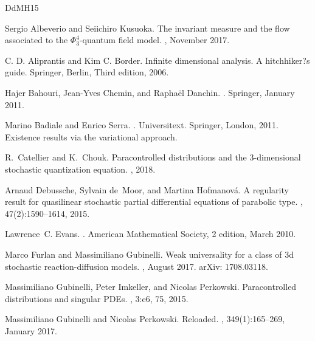 \documentclass[a4paper,11pt]{article}
\numberwithin{equation}{section}
\newcommand{\8}{\infty}
\begin{document}
\begin{thebibliography}{DdMH15}

Sergio Albeverio and Seiichiro Kusuoka.
\newblock The invariant measure and the flow associated to the
  {$\Phi^4_3$}-quantum field model.
, November 2017.


C. D. Aliprantis and Kim C. Border.
\newblock Infinite dimensional analysis. A hitchhiker?s guide.
\newblock Springer, Berlin, Third edition, 2006. 

Hajer Bahouri, Jean-Yves Chemin, and Rapha{\"e}l Danchin.
.
\newblock Springer, January 2011.

Marino Badiale and Enrico Serra.
.
\newblock Universitext. Springer, London, 2011.
\newblock Existence results via the variational approach.

R.~Catellier and K.~Chouk.
\newblock Paracontrolled distributions and the 3-dimensional stochastic
  quantization equation.
, 2018.

Arnaud Debussche, Sylvain de~Moor, and Martina Hofmanov\'a.
\newblock A regularity result for quasilinear stochastic partial differential
  equations of parabolic type.
, 47(2):1590--1614, 2015.

Lawrence~C. Evans.
.
\newblock American Mathematical Society, 2 edition, March 2010.

Marco Furlan and Massimiliano Gubinelli.
\newblock Weak universality for a class of 3d stochastic reaction-diffusion
  models.
, August 2017.
\newblock arXiv: 1708.03118.

Massimiliano Gubinelli, Peter Imkeller, and Nicolas Perkowski.
\newblock Paracontrolled distributions and singular {PDEs}.
, 3:e6, 75, 2015.

Massimiliano Gubinelli and Nicolas Perkowski.
 {Reloaded}.
, 349(1):165--269,
  January 2017.


\end{thebibliography}
\end{document}
